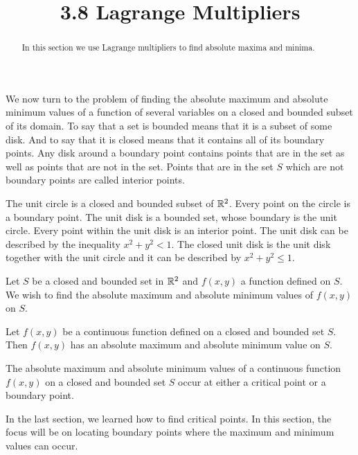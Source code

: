 \documentclass[handout]{ximera}
\title{3.8 Lagrange Multipliers}
\begin{document}
\begin{abstract}
In this section we use Lagrange multipliers to find absolute maxima and minima.
\end{abstract}

\maketitle

We now turn to the problem of finding the absolute maximum and absolute minimum values
of a function of several variables on a closed and bounded subset of its domain.
To say that a set is bounded means that it is a subset of some disk.  And to say that it is closed means that it contains 
all of its boundary points. 
Any disk around a boundary point contains points that are in the set as well as points that are not in the set.
Points that are in the set $S$ which are not boundary points are called interior points.

The unit circle is a closed and bounded subset of $\mathbb R^2$.  Every point on the circle is a boundary point.
The unit disk is a bounded set, whose boundary is the unit circle. Every point within the unit disk is an interior point.
The unit disk can be described by the inequality $x^2 + y^2 < 1$.
The closed unit disk is the unit disk together with the unit circle and it can be described by $x^2 + y^2 \leq 1$.

Let $S$ be a closed and bounded set in $\mathbb R^2$ and $f(x,y)$ a function defined on $S$. 
We wish to find the absolute maximum and absolute minimum values of $f(x,y)$ on $S$.

\begin{theorem}
Let $f(x,y)$ be a continuous function defined on a closed and bounded set $S$.
Then $f(x,y)$ has an absolute maximum and absolute minimum value on $S$.
\end{theorem}

\begin{theorem}
The absolute maximum and absolute minimum values of a continuous function $f(x,y)$ on a closed and bounded set $S$ 
occur at either a critical point or a boundary point.
\end{theorem}

In the last section, we learned how to find critical points. 
In this section, the focus will be on locating boundary points where the maximum and minimum values can occur.
\end{document}
